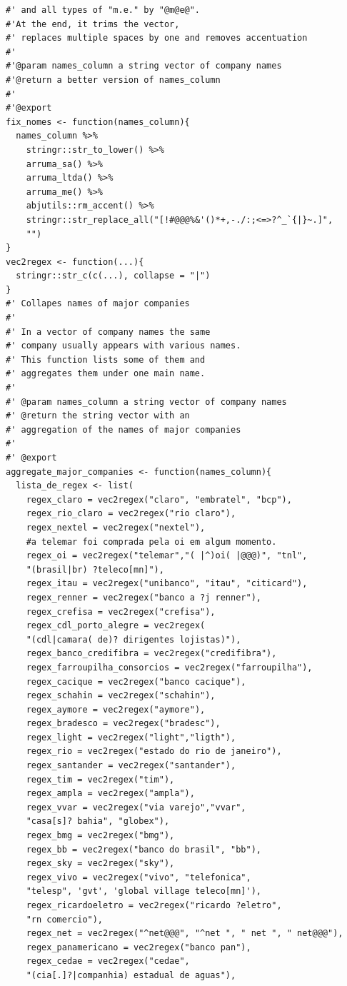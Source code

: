 \documentclass[]{report}
\begin{document}
\begin{verbatim}
#' and all types of "m.e." by "@m@e@".
#'At the end, it trims the vector,
#' replaces multiple spaces by one and removes accentuation
#'
#'@param names_column a string vector of company names
#'@return a better version of names_column
#'
#'@export
fix_nomes <- function(names_column){
  names_column %>%
    stringr::str_to_lower() %>%
    arruma_sa() %>%
    arruma_ltda() %>%
    arruma_me() %>%
    abjutils::rm_accent() %>%
    stringr::str_replace_all("[!#@@@%&'()*+,-./:;<=>?^_`{|}~.]",
    "")
}
vec2regex <- function(...){
  stringr::str_c(c(...), collapse = "|")
}
#' Collapes names of major companies
#'
#' In a vector of company names the same
#' company usually appears with various names.
#' This function lists some of them and
#' aggregates them under one main name.
#'
#' @param names_column a string vector of company names
#' @return the string vector with an
#' aggregation of the names of major companies
#'
#' @export
aggregate_major_companies <- function(names_column){
  lista_de_regex <- list(
    regex_claro = vec2regex("claro", "embratel", "bcp"),
    regex_rio_claro = vec2regex("rio claro"),
    regex_nextel = vec2regex("nextel"),
    #a telemar foi comprada pela oi em algum momento.
    regex_oi = vec2regex("telemar","( |^)oi( |@@@)", "tnl",
    "(brasil|br) ?teleco[mn]"),
    regex_itau = vec2regex("unibanco", "itau", "citicard"),
    regex_renner = vec2regex("banco a ?j renner"),
    regex_crefisa = vec2regex("crefisa"),
    regex_cdl_porto_alegre = vec2regex(
    "(cdl|camara( de)? dirigentes lojistas)"),
    regex_banco_credifibra = vec2regex("credifibra"),
    regex_farroupilha_consorcios = vec2regex("farroupilha"),
    regex_cacique = vec2regex("banco cacique"),
    regex_schahin = vec2regex("schahin"),
    regex_aymore = vec2regex("aymore"),
    regex_bradesco = vec2regex("bradesc"),
    regex_light = vec2regex("light","ligth"),
    regex_rio = vec2regex("estado do rio de janeiro"),
    regex_santander = vec2regex("santander"),
    regex_tim = vec2regex("tim"),
    regex_ampla = vec2regex("ampla"),
    regex_vvar = vec2regex("via varejo","vvar",
    "casa[s]? bahia", "globex"),
    regex_bmg = vec2regex("bmg"),
    regex_bb = vec2regex("banco do brasil", "bb"),
    regex_sky = vec2regex("sky"),
    regex_vivo = vec2regex("vivo", "telefonica",
    "telesp", 'gvt', 'global village teleco[mn]'),
    regex_ricardoeletro = vec2regex("ricardo ?eletro",
    "rn comercio"),
    regex_net = vec2regex("^net@@@", "^net ", " net ", " net@@@"),
    regex_panamericano = vec2regex("banco pan"),
    regex_cedae = vec2regex("cedae",
    "(cia[.]?|companhia) estadual de aguas"),

\end{verbatim}
\end{document}
